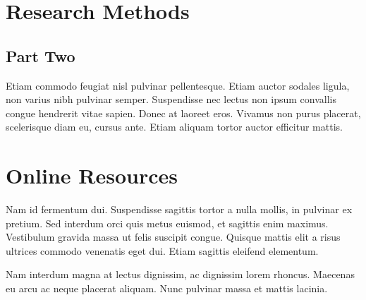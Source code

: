 \documentclass[sigchi]{acmart}
\begin{document}



\appendix

\section{Research Methods}


\subsection{Part Two}

Etiam commodo feugiat nisl pulvinar pellentesque. Etiam auctor sodales
ligula, non varius nibh pulvinar semper. Suspendisse nec lectus non
ipsum convallis congue hendrerit vitae sapien. Donec at laoreet
eros. Vivamus non purus placerat, scelerisque diam eu, cursus
ante. Etiam aliquam tortor auctor efficitur mattis.

\section{Online Resources}

Nam id fermentum dui. Suspendisse sagittis tortor a nulla mollis, in
pulvinar ex pretium. Sed interdum orci quis metus euismod, et sagittis
enim maximus. Vestibulum gravida massa ut felis suscipit
congue. Quisque mattis elit a risus ultrices commodo venenatis eget
dui. Etiam sagittis eleifend elementum.

Nam interdum magna at lectus dignissim, ac dignissim lorem
rhoncus. Maecenas eu arcu ac neque placerat aliquam. Nunc pulvinar
massa et mattis lacinia.
\end{document}
